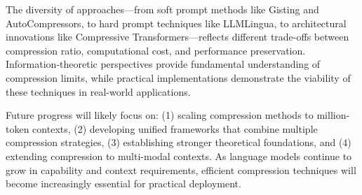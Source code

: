 \documentclass[11pt]{article}
\begin{document}
The diversity of approaches---from soft prompt methods like Gisting and AutoCompressors, to hard prompt techniques like LLMLingua, to architectural innovations like Compressive Transformers---reflects different trade-offs between compression ratio, computational cost, and performance preservation. Information-theoretic perspectives provide fundamental understanding of compression limits, while practical implementations demonstrate the viability of these techniques in real-world applications.

Future progress will likely focus on: (1) scaling compression methods to million-token contexts, (2) developing unified frameworks that combine multiple compression strategies, (3) establishing stronger theoretical foundations, and (4) extending compression to multi-modal contexts. As language models continue to grow in capability and context requirements, efficient compression techniques will become increasingly essential for practical deployment.
\end{document}
